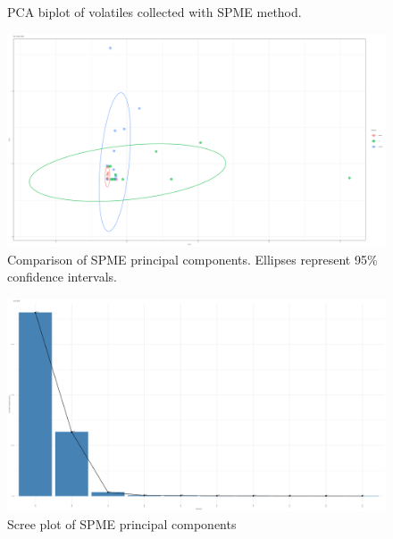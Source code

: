 \documentclass{ufdissertation}[overrideChapters] %
\begin{document}
{\begin{figure}
{}

\caption[PCA biplot of volatiles collected with SPME]{PCA biplot of volatiles collected with SPME method.}\label{fig:spme-vocs}
\end{figure}
\begin{figure}

{\centering \includegraphics[width=1\linewidth]{figure/rrv_volatiles_comparison_pca_comp_spme} 

}

\caption[Comparison of SPME principal components]{Comparison of SPME principal components. Ellipses represent 95\% confidence intervals.}\label{fig:spme-vocs-compares}
\end{figure}
\begin{figure}

{\centering \includegraphics[width=1\linewidth]{figure/rrv_volatiles_screeplot_pca_spme} 

}

\caption[Scree plot of SPME principal components]{Scree plot of SPME principal components}\label{fig:spme-vocs-scree}
\end{figure}
\begin{figure}


\end{figure}}
\end{document}
